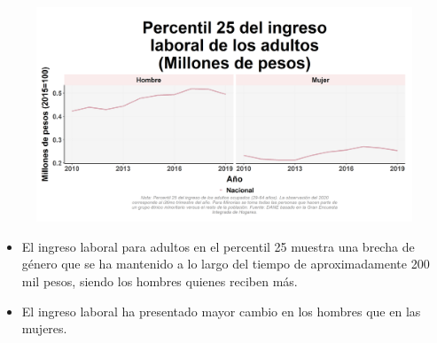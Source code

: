     \begin{figure}[H]
        \caption[Percentil 25 del ingreso laboral de los adultos por género ]{\label{inglab25adu_gen_trend} }
        \begin{center}
        \includegraphics[width=\textwidth,keepaspectratio]{img/var_9_trend.png}
        \end{center}
    \end{figure}
            \begin{itemize}
                \item El ingreso laboral para adultos en el percentil 25 muestra una brecha de género que se ha mantenido a lo largo del tiempo de aproximadamente 200 mil pesos, siendo los hombres quienes reciben más.
                \item El ingreso laboral ha presentado mayor cambio en los hombres que en las mujeres.
                \end{itemize}

